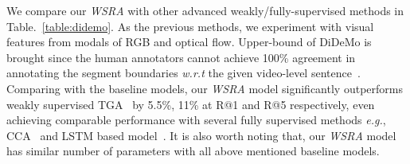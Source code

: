 We compare our \textit{WSRA}  with other advanced weakly/fully-supervised methods in Table.~\ref{table:didemo}. 
As the previous methods, 
we experiment with visual features from modals of RGB and optical flow. 
Upper-bound of DiDeMo is brought since the human annotators cannot achieve 100\% agreement in 
annotating the segment boundaries \emph{w.r.t} the given video-level sentence~\citep{anne2017localizing}.
Comparing with the baseline models, 
our \textit{WSRA} model  significantly outperforms weakly supervised TGA~\citep{Mithun_2019_CVPR} by 5.5\%, 11\% at R@1 and R@5 respectively, 
even achieving comparable performance with several fully supervised methods \emph{e.g.}, CCA~\citep{anne2017localizing} and LSTM based model~\citep{anne2017localizing}. 
It is also worth noting that, our \textit{WSRA} model has similar number of parameters with all above mentioned baseline models. 



